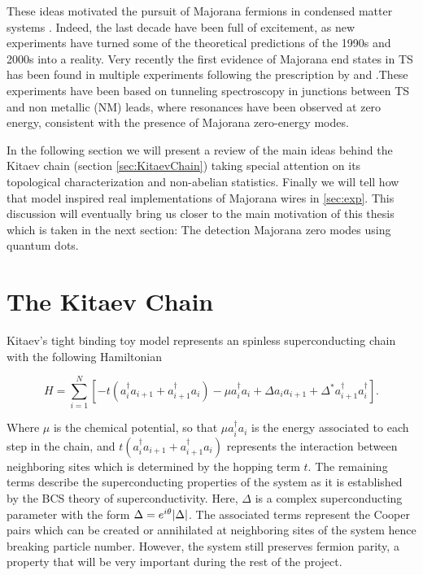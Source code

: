These ideas motivated the pursuit of Majorana fermions in condensed matter systems \citep{fu_superconducting_2008,sato_non-abelian_2009,alicea_new_2012,beenakker_search_2013}. Indeed, the last decade have been full of excitement, as new experiments have turned some of the theoretical predictions of the 1990s and 2000s into a reality. Very recently the first evidence of Majorana end states
in TS has been found in multiple experiments \citep{mourik_signatures_2012,das_zero-bias_2012,deng_anomalous_2012,deng_majorana_2016,zhang_quantized_2018}
following the prescription by \citet{oreg_helical_2010} and \citet{lutchyn_majorana_2010}.These experiments have been based on tunneling spectroscopy in junctions between TS and non metallic (NM) leads, where resonances have been
observed at zero energy, consistent with the presence of Majorana zero-energy modes.

In the following section we will present a review of the main ideas behind the Kitaev chain (section \ref{sec:KitaevChain}) taking special attention on its topological characterization and non-abelian statistics. Finally we will tell how that model inspired real implementations of Majorana wires in \ref{sec:exp}. This discussion will eventually bring us closer  to the main motivation of this thesis which is taken in the next section: The detection Majorana zero modes using quantum dots. 







\section{The Kitaev Chain \label{sec:KitaevChain}}

Kitaev's tight binding toy model  represents an spinless superconducting chain with the following Hamiltonian

\begin{equation}
H = \sum_{i=1}^N \left[ -t(a_i^{\dagger} a_{i+1} + a_{i+1}^{\dagger}a_i) -\mu a_i^{\dagger} a_{i} +  \Delta a_{i}a_{i+1} + \Delta^* a_{i+1}^{\dagger}a_i^{\dagger} \right].  \label{eq:kitaevHam}
\end{equation}



\noindent Where $\mu$ is the chemical potential, so that $\mu a_i^{\dagger} a_{i}$ is the energy associated to each step in the chain, and $t(a_i^{\dagger} a_{i+1} + a_{i+1}^{\dagger}a_i)$ represents the interaction between neighboring sites which is determined by the hopping term $t$. The remaining terms describe the superconducting properties of the system as it is established by the BCS theory of superconductivity. Here, $\Delta$ is a complex superconducting parameter with the form  $\Delta = e^{i\theta} \vert \Delta \vert$. The associated terms represent the Cooper pairs which can be created or annihilated at neighboring sites of the system hence breaking particle number. However, the system still preserves fermion parity, a property that will be very important during the rest of the project. 

